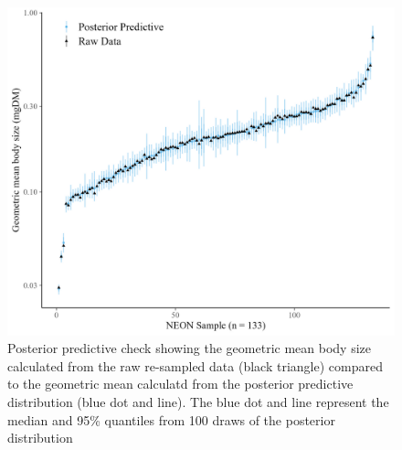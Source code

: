 \documentclass[
  12pt,
]{article}
\begin{document}
\newpage

\begin{figure}
\includegraphics[width=1\linewidth]{../plots/post_pred_gm} \caption{Posterior predictive check showing the geometric mean body size calculated from the raw re-sampled data (black triangle) compared to the geometric mean calculatd from the posterior predictive distribution (blue dot and line). The blue dot and line represent the median and 95\% quantiles from 100 draws of the posterior distribution}\label{fig:unnamed-chunk-2}
\end{figure}
\end{document}
